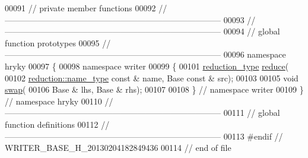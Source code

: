 \begin{DoxyCode}
00091 \textcolor{comment}{// private member functions}
00092 \textcolor{comment}{//
      ------------------------------------------------------------------------------}
00093 \textcolor{comment}{//
      ------------------------------------------------------------------------------}
00094 \textcolor{comment}{// global function prototypes}
00095 \textcolor{comment}{//
      ------------------------------------------------------------------------------}
00096 \textcolor{keyword}{namespace }hryky
00097 \{
00098 \textcolor{keyword}{namespace }writer
00099 \{
00101     \hyperlink{namespacehryky_a343a9a4c36a586be5c2693156200eadc}{reduction_type} \hyperlink{namespacehryky_af41cb3af6766761da0ff21b84527a52c}{reduce}(
00102         \hyperlink{namespacehryky_1_1reduction_ac686c30a4c8d196bbd0f05629a6b921f}{reduction::name_type} \textcolor{keyword}{const} & name, Base \textcolor{keyword}{const} & src);
00103 
00105     \textcolor{keywordtype}{void} \hyperlink{namespacehryky_a4282146df5ea2b68cb667896a2205909}{swap}(
00106         Base & lhs, Base & rhs);
00107 
00108 \} \textcolor{comment}{// namespace writer}
00109 \} \textcolor{comment}{// namespace hryky}
00110 \textcolor{comment}{//
      ------------------------------------------------------------------------------}
00111 \textcolor{comment}{// global function definitions}
00112 \textcolor{comment}{//
      ------------------------------------------------------------------------------}
00113 \textcolor{preprocessor}{#endif // WRITER\_BASE\_H\_20130204182849436}
00114 \textcolor{preprocessor}{}\textcolor{comment}{// end of file}
\end{DoxyCode}
